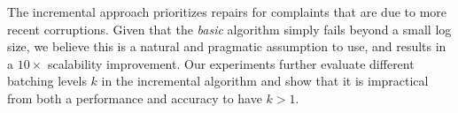 The incremental approach prioritizes repairs for complaints that are due to more recent corruptions.
Given that the \emph{basic} algorithm simply fails beyond a small log size, we believe this is a natural and pragmatic assumption to use, and results in 
a $10\times$ scalability improvement.
Our experiments further evaluate different batching levels $k$ in the incremental algorithm and show that it is impractical from both a performance and accuracy to have $k > 1$.






